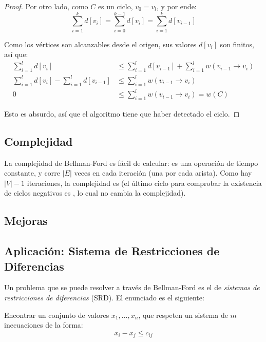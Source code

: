 \begin{proof}
    Por otro lado, como $C$ es un ciclo, $v_0 = v_l$, y por ende:
    $$\sum_{i = 1}^k d[v_i] = \sum_{i = 0}^{k - 1} d[v_i] = \sum_{i = 1}^k d[v_{i - 1}]$$

    Como los vértices son alcanzables desde el origen, sus valores $d[v_i]$ son finitos, así que:
    \begin{align*}
        \sum_{i = 1}^l d[v_i]                               & \leq \sum_{i = 1}^l d[v_{i - 1}] + \sum_{i = 1}^l w(v_{i - 1} \rightarrow v_i) \\
        \sum_{i = 1}^l d[v_i] - \sum_{i = 1}^l d[v_{i - 1}] & \leq \sum_{i = 1}^l w(v_{i - 1} \rightarrow v_i)                               \\
        0                                                   & \leq \sum_{i = 1}^l w(v_{i - 1} \rightarrow v_i) = w(C)
    \end{align*}

    Esto es absurdo, así que el algoritmo tiene que haber detectado el ciclo.

\end{proof}

\subsection{Complejidad}

La complejidad de Bellman-Ford es fácil de calcular:  es una operación de tiempo constante, y corre $|E|$ veces en cada iteración (una por cada arista). Como hay $|V| - 1$ iteraciones, la complejidad es  (el último ciclo para comprobar la existencia de ciclos negativos es , lo cual no cambia la complejidad).

\subsection{Mejoras}


\subsection{Aplicación: Sistema de Restricciones de Diferencias}

Un problema que se puede resolver a través de Bellman-Ford es el de \textit{sistemas de restricciones de diferencias} (SRD). El enunciado es el siguiente:

\begin{problema}
    Encontrar un conjunto de valores $x_1, ..., x_n$, que respeten un sistema de $m$ inecuaciones de la forma:
    $$x_i - x_j \leq c_{ij}$$
\end{problema}

